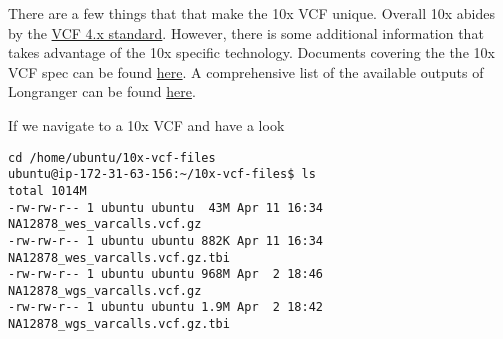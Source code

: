 \documentclass[]{article}
\begin{document}
There are a few things that that make the 10x VCF unique. Overall 10x
abides by the
\href{https://samtools.github.io/hts-specs/VCFv4.2.pdf}{VCF 4.x
standard}. However, there is some additional information that takes
advantage of the 10x specific technology. Documents covering the the 10x
VCF spec can be found
\href{https://support.10xgenomics.com/genome-exome/software/pipelines/latest/output/vcf}{here}.
A comprehensive list of the available outputs of Longranger can be found
\href{https://support.10xgenomics.com/genome-exome/software/pipelines/latest/what-is-long-ranger}{here}.

If we navigate to a 10x VCF and have a look

\begin{verbatim}
cd /home/ubuntu/10x-vcf-files
ubuntu@ip-172-31-63-156:~/10x-vcf-files$ ls
total 1014M
-rw-rw-r-- 1 ubuntu ubuntu  43M Apr 11 16:34 NA12878_wes_varcalls.vcf.gz
-rw-rw-r-- 1 ubuntu ubuntu 882K Apr 11 16:34 NA12878_wes_varcalls.vcf.gz.tbi
-rw-rw-r-- 1 ubuntu ubuntu 968M Apr  2 18:46 NA12878_wgs_varcalls.vcf.gz
-rw-rw-r-- 1 ubuntu ubuntu 1.9M Apr  2 18:42 NA12878_wgs_varcalls.vcf.gz.tbi
\end{verbatim}
\end{document}
